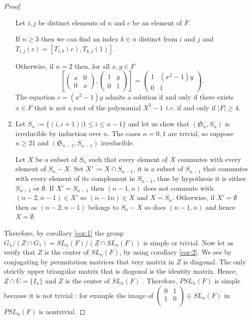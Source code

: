 \begin{proof}
\begin{enumerate}
            Let $i,j$ be distinct elements of $n$ and $c$ be an element of $F$.

            If $n\ge 3$ then we can find an index $k \in n$ distinct from $i$ and $j$ and $T_{i,j}\left( c \right)= [T_{i,k}(c), T_{k,j}(1)]$.

            Otherwise, if $n=2$ then, for all $x, y \in F$
    $$\left[ \begin{pmatrix} x & 0 \\ 0 & x \end{pmatrix}, \begin{pmatrix} 1 & y \\ 0 &1 \end{pmatrix} \right] = \begin{pmatrix} 1 & (x^2-1) y \\ 0 & 1 \end{pmatrix}.$$
    The equation $c = \left( x^2 -1  \right) y$ admits a solution if and only if there exists $x\in F$ that is not a root of the polynomial $X^2-1$ \textit{i.e.} if and only if $|F| \ge 4$.

        \item Let $S_n := \{(i,i+1) | 1\le i\le n-1\}$ and let us show that $\left( \mathfrak{S}_n,S_n \right)$ is irreducible by induction over $n$.
            The cases $n=0,1$ are trivial, so suppose $n\ge21$ and $\left( \mathfrak{S}_{n-1}, S_{n-1} \right)$ irreducible.

            Let $X$ be a subset of $S_n$ such that every element of $X$ commutes with every element of $S_n -X$. Set $X' := X \cap S_{n-1}$, it is a subset of $S_{n-1}$ that commutes with every element of its complement in $S_{n-1}$, thus by hypothesis it is either $S_{n-1}$ or $\emptyset$. If $X' = S_{n-1}$ then $\left( n-1,n \right)$ does not commute with $(n-2,n-1) \in X'$ so $\left( n-1n \right)\in X$ and $X = S_n$. Otherwise, if $X' = \emptyset$ then as $\left( n-2,n-1 \right)$ belongs to $S_n -X$ so does $\left( n-1,n \right)$ and hence $X=\emptyset$.
    \end{enumerate}

    Therefore, by corollary \ref{cor:1} the group $G_1 / (Z \cap G_1) = SL_n(F) / \left( Z \cap SL_n\left( F \right) \right)$ is simple or trivial.
    Now let us verify that $Z$ is the center of $SL_n\left( F \right)$, by using corollary \ref{cor:2}. We see by conjugating by permutation matrices that very matrix in $Z$ is diagonal. The only strictly upper triangular matrix that is diagonal is the identity matrix. Hence, $Z \cap U = \{I_n\}$ and $Z$ is the center of $SL_n\left( F \right)$ . Therefore, $PSL_n\left( F \right)$ is simple because it is not trivial : for example the image of $\left( \begin{smallmatrix}
            0 & 1 \\ 1 & 0\\
    \end{smallmatrix}
     \right) \in SL_n\left( F \right)$ in $PSL_n(F)$ is nontrivial.
\end{proof}  




